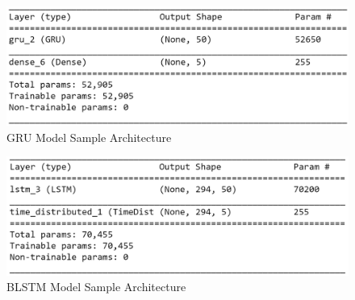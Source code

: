 \documentclass[letterpaper, 12 pt, conference]{ieeeconf}  %
\begin{document}
\begin{figure}[!h]
\centering
\includegraphics[scale=0.60]{../figs/model_arch/gru.png}	
\caption{GRU Model Sample Architecture}
\label{fig:GRU_Arch_Model} 
\end{figure}


\begin{figure}[!h]
\centering
\includegraphics[scale=0.60]{../figs/model_arch/blstm.png}	
\caption{BLSTM Model Sample Architecture}
\label{fig:BLSTM_Arch_Model} 
\end{figure}




\end{document}
